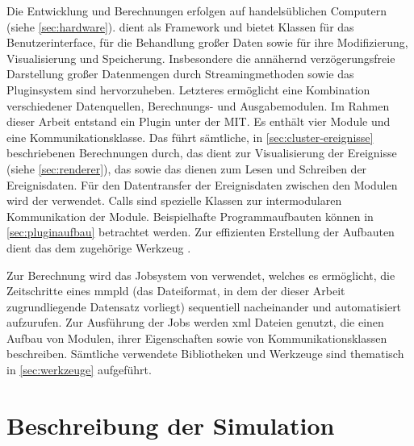Die Entwicklung und Berechnungen erfolgen auf handelsüblichen Computern (siehe \autoref{sec:hardware}).  dient als Framework und bietet Klassen für das Benutzerinterface, für die Behandlung großer Daten sowie für ihre Modifizierung, Visualisierung und Speicherung. Insbesondere die annähernd verzögerungsfreie Darstellung großer Datenmengen durch Streamingmethoden sowie das Pluginsystem sind hervorzuheben. Letzteres ermöglicht eine Kombination verschiedener Datenquellen, Berechnungs- und Ausgabemodulen. Im Rahmen dieser Arbeit entstand ein Plugin unter der \gls{MIT}. Es enthält vier Module und eine Kommunikationsklasse. Das  führt sämtliche, in \autoref{sec:cluster-ereignisse} beschriebenen Berechnungen durch, das  dient zur Visualisierung der Ereignisse (siehe \autoref{sec:renderer}), das  sowie das  dienen zum Lesen und Schreiben der Ereignisdaten. Für den Datentransfer der Ereignisdaten zwischen den Modulen wird der  verwendet. Calls sind spezielle Klassen zur intermodularen Kommunikation der  Module. Beispielhafte Programmaufbauten können in \autoref{sec:pluginaufbau} betrachtet werden. Zur effizienten Erstellung der Aufbauten dient das dem  zugehörige Werkzeug .

Zur Berechnung wird das Jobsystem von  verwendet, welches es ermöglicht, die Zeitschritte eines \gls{mmpld} (das Dateiformat, in dem der dieser Arbeit zugrundliegende Datensatz vorliegt) sequentiell nacheinander und automatisiert aufzurufen. Zur Ausführung der Jobs werden \gls{xml} Dateien genutzt, die einen Aufbau von Modulen, ihrer Eigenschaften sowie von Kommunikationsklassen beschreiben. Sämtliche verwendete Bibliotheken und Werkzeuge sind thematisch in \autoref{sec:werkzeuge} aufgeführt.



\section{Beschreibung der Simulation}\label{sec:simulation}

